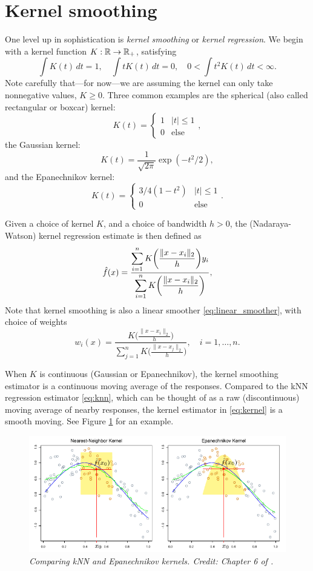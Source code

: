 \documentclass{article}
\begin{document}
\section{Kernel smoothing}

One level up in sophistication is \emph{kernel smoothing} or \emph{kernel 
  regression}. We begin with a kernel function $K : \mathbb{R} \to \mathbb{R}_+$, satisfying    
\[
\int K(t) \, dt = 1, \quad
\int t K(t) \, dt = 0, \quad
0 < \int t^2 K(t) \, dt < \infty.
\]
Note carefully that---for now---we are assuming the kernel can only take
nonnegative values, $K \geq 0$. Three common examples are the spherical (also
called rectangular or boxcar) kernel: 
\[
K(t) = 
\begin{cases}
1 & |t| \leq 1 \\
0 & \text{else}
\end{cases},
\]
the Gaussian kernel:
\[
K(t) = \frac{1}{\sqrt{2\pi}} \exp(-t^2/2),
\]
and the Epanechnikov kernel:
\[
K(t) = \begin{cases}
3/4 (1-t^2) & |t| \leq 1 \\ 
0 & \text{else}
\end{cases}.
\]

Given a choice of kernel $K$, and a choice of bandwidth $h>0$, the
(Nadaraya-Watson) kernel regression estimate is then defined as
\begin{equation}
\label{eq:kernel}
\hat{f}(x) = 
\frac{\displaystyle \sum_{i=1}^n K\bigg( \frac{\|x-x_i\|_2}{h} \bigg)  y_i}  
{\displaystyle \sum_{i=1}^n K\bigg( \frac{\|x-x_i\|_2}{h} \bigg)}, 
\end{equation}
Note that kernel smoothing is also a linear smoother \eqref{eq:linear_smoother},
with choice of weights  
\[
w_i(x) = 
\frac{\displaystyle K\bigg ( \frac{\|x-x_i\|_2}{h} \bigg)}
{\displaystyle \sum_{j=1}^n K\bigg ( \frac{\|x-x_j\|_2}{h} \bigg)},
\quad i=1,\dots,n. 
\]

When $K$ is continuous (Gaussian or Epanechnikov), the kernel smoothing
estimator is a continuous moving average of the responses. Compared to the kNN
regression estimator \eqref{eq:knn}, which can be thought of as a raw 
(discontinuous) moving average of nearby responses, the kernel estimator in 
\eqref{eq:kernel} is a smooth moving. See Figure \ref{fig:kernel} for an example.

\begin{figure}[tb]
\centering
\includegraphics[width=\textwidth]{kernels.pdf}
\caption{\it Comparing kNN and Epanechnikov kernels. Credit: Chapter 6 of
  \citet{hastie2009elements}.}      
\label{fig:kernel}
\end{figure}
\end{document}
